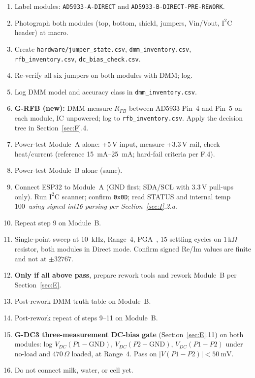 \documentclass[11pt,a4paper]{article}
\newcommand{\kohm}[1]{\ensuremath{#1\,\mathrm{k}\Omega}}
\newcommand{\Rohm}[1]{\ensuremath{#1\,\Omega}}
\begin{document}
\begin{enumerate}
\item Label modules: \texttt{AD5933-A-DIRECT} and \texttt{AD5933-B-DIRECT-PRE-REWORK}.
\item Photograph both modules (top, bottom, shield, jumpers, Vin/Vout, $\mathrm{I^2C}$ header) at macro.
\item Create \texttt{hardware/jumper\_state.csv}, \texttt{dmm\_inventory.csv}, \texttt{rfb\_inventory.csv}, \texttt{dc\_bias\_check.csv}.
\item Re-verify all six jumpers on both modules with DMM; log.
\item Log DMM model and accuracy class in \texttt{dmm\_inventory.csv}.
\item \textbf{G-RFB (new):} DMM-measure $R_{FB}$ between AD5933 Pin~4 and Pin~5 on each module, IC unpowered; log to \texttt{rfb\_inventory.csv}. Apply the decision tree in Section~\ref{sec:F}.4.
\item Power-test Module~A alone: +5\,V input, measure +3.3\,V rail, check heat/current (reference \SIrange{15}{25}{\milli\ampere}; hard-fail criteria per F.4).
\item Power-test Module~B alone (same).
\item Connect ESP32 to Module~A (GND first; SDA/SCL with 3.3\,V pull-ups only). Run $\mathrm{I^2C}$ scanner; confirm \texttt{0x0D}; read STATUS and internal temp 100\texttimes\ \emph{using signed int16 parsing per Section~\ref{sec:I}.2.a}.
\item Repeat step 9 on Module~B.
\item Single-point sweep at \SI{10}{\kilo\hertz}, Range~4, PGA~, 15 settling cycles on \kohm{1} resistor, both modules in Direct mode. Confirm signed Re/Im values are finite and not at $\pm 32767$.
\item \textbf{Only if all above pass}, prepare rework tools and rework Module~B per Section~\ref{sec:E}.
\item Post-rework DMM truth table on Module~B.
\item Post-rework repeat of steps 9--11 on Module~B.
\item \textbf{G-DC3 three-measurement DC-bias gate} (Section~\ref{sec:E}.11) on both modules: log $V_{DC}(P1\!-\!\mathrm{GND})$, $V_{DC}(P2\!-\!\mathrm{GND})$, $V_{DC}(P1\!-\!P2)$ under no-load and \Rohm{470} loaded, at Range~4. Pass on $|V(P1\!-\!P2)| < \SI{50}{\milli\volt}$.
\item Do not connect milk, water, or cell yet.
\end{enumerate}
\end{document}
